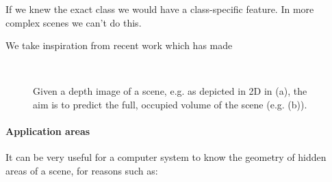 \documentclass[10pt,twocolumn,letterpaper]{article}
\makeatletter
\renewcommand*{\eg}{e.g.\@\xspace}
\makeatother
\begin{document}
If we knew the exact class we would have a class-specific feature.
In more complex scenes we can't do this.

We take inspiration from recent work which has made


\begin{figure}
  \centering 
      \hfill
   \\
  \caption{Given a depth image of a scene, \eg as depicted in 2D in (a), the aim is to predict the full, occupied volume of the scene (e.g. (b)).}
\end{figure}


\paragraph{Application areas}
It can be very useful for a computer system to know the geometry of hidden areas of a scene, for reasons such as:
\end{document}
